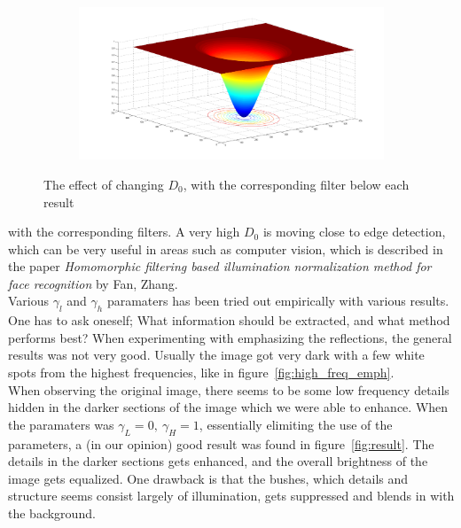 \begin{figure}[h!]
\begin{subfigure}[b]{0.6\textwidth}
				\caption{}
				\label{fig:low_sigma_filter}
			\end{subfigure}%
			\begin{subfigure}[b]{0.6\textwidth}
				\includegraphics[width=\textwidth]{pics/high_sigma_filter.png}
				\caption{}
				\label{fig:high_sigma_filter}
			\end{subfigure}
			\label{fig:sigma}
		\caption{The effect of changing $D_0$, with the corresponding filter below each result}				
		\end{figure}
		with the corresponding filters. A very high $D_0$ is moving close to edge detection,
		which can be very useful in areas such as computer vision, which is described in 
		the paper \emph{Homomorphic filtering based illumination normalization 
		method for face recognition} by Fan, Zhang.
		\\
		Various $\gamma_l$ and $\gamma_h$ paramaters has been tried out empirically with 
		various results. One has to ask oneself; What information should be extracted, and what 
		method performs best? When experimenting with emphasizing the reflections, the 
		general results was not very good. Usually the image got very dark with a few white
		spots from the highest frequencies, like in figure~\ref{fig:high_freq_emph}.
		\\
		When observing the original image, there seems to be some 
		low frequency details hidden in the darker sections of the image which we were able
		to enhance. When the paramaters was $\gamma_L = 0,~\gamma_H = 1$,
		essentially elimiting the use of the parameters, a (in our opinion) good result was 
		found in figure~\ref{fig:result}. The details in the darker sections gets enhanced, 
		and the overall brightness
		of the image gets equalized. One drawback is that the bushes, which details 
		and structure seems consist
		largely of illumination, gets suppressed and blends in with the background.\\
